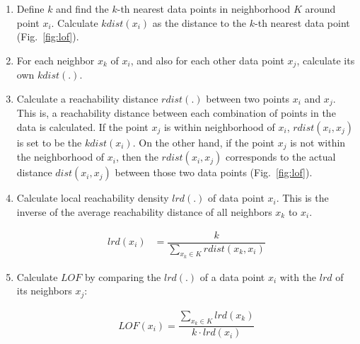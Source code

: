 \documentclass[conference]{IEEEtran}
\begin{document}
\begin{enumerate}
    \item Define $k$ and find the $k$-th nearest data points in neighborhood $K$ around point $x_i$. Calculate $kdist(x_i)$ as the distance to the $k$-th nearest data point (Fig.~\ref{fig:lof}).
    
    \item For each neighbor $x_k$  of $x_i$, and also for each other data point $x_j$, calculate its own $kdist(.)$.
        
    \item Calculate a reachability distance $rdist(.)$ between two points $x_i$ and $x_j$. This is, a reachability distance between each combination of points in the data is calculated. If the point $x_j$ is within neighborhood of $x_i$, $rdist(x_i,x_j)$ is set to be the $kdist(x_i)$. On the other hand, if the point $x_j$ is not within the neighborhood of $x_i$, then the $rdist(x_i,x_j)$ corresponds to the actual distance $dist(x_i,x_j)$ between those two data points (Fig.~\ref{fig:lof}).
    
    \item Calculate local reachability density $lrd(.)$ of data point $x_i$. This is the inverse of the average reachability distance of all neighbors $x_k$ to $x_i$.
        
        \begin{align}
            \label{eq:lrd}
            lrd(x_i) &= \dfrac{k}{\sum \limits_{x_k \in K} rdist(x_k,x_i) }%
        \end{align}
    
    \item Calculate $LOF$ by comparing the $lrd(.)$ of a data point $x_i$ with the $lrd$ of its neighbors $x_j$:
    
        \begin{eqnarray}
            \label{eq:lof}
            LOF(x_i) = \dfrac{\sum \limits_{x_k \in K} lrd(x_k)}{k \cdot  lrd(x_i)}
        \end{eqnarray}
            
        
            
\end{enumerate}
\end{document}
